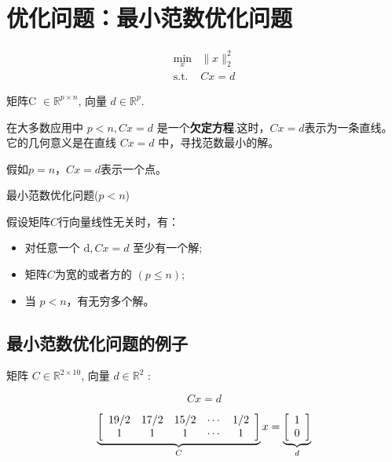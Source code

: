 \section{优化问题：最小范数优化问题}

\begin{problem}

$$\begin{aligned}
    \min _{x} &\|x\|_{2}^{2}\\
   \text{s.t.} &C x=d 
\end{aligned}$$

矩阵C $ \in \mathbb{R}^{p \times n} $, 向量 $ d \in \mathbb{R}^{p} $.
\end{problem}


在大多数应用中 $ p<n,  C x=d $ 是一个\textbf{欠定方程}.这时，$C x=d$表示为一条直线。它的几何意义是在直线 $ C x=d $ 中，寻找范数最小的解。

假如$p = n$，$C x=d$表示一个点。

\begin{FigureCenter}{最小范数优化问题($p < n$)}
    
\end{FigureCenter}



假设矩阵$C$行向量线性无关时，有：
\begin{itemize}
    \item 对任意一个 $ \mathrm{d}, C x=d $ 至少有一个解;
    \item 矩阵$C$为宽的或者方的 $ (p \leq n) $;
    \item 当 $ p<n $，有无穷多个解。
\end{itemize}

\subsection{最小范数优化问题的例子}

\begin{problem}
    矩阵 $ C \in \mathbb{R}^{2 \times 10} $, 向量 $ d \in \mathbb{R}^{2} $ :

$$Cx=d$$

$$\displaystyle \underbrace{\left[\begin{array}{ c c c c c }
    19/2 & 17/2 & 15/2 & \cdots  & 1/2\\
    1 & 1 & 1 & \cdots  & 1
    \end{array}\right]}_{C} x=\underbrace{\left[\begin{array}{ l }
    1\\
    0
    \end{array}\right]}_{d}$$
\end{problem}

